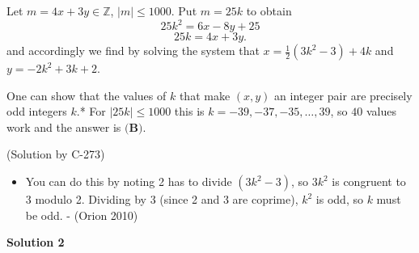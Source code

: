 \begin{enumerate}
 Let $m = 4x+3y \in \mathbb Z$, $\left\lvert m \right\rvert \le 1000$.  Put $m = 25k$ to obtain
 \[25k^2 = 6x-8y+25\]
 \[25k = 4x+3y.\]and accordingly we find by solving the system that $x = \frac{1}{2} (3k^2-3) + 4k$ and $y = -2k^2+3k+2$.

 One can show that the values of $k$ that make $(x,y)$ an integer pair are precisely odd integers $k$.*  For $\left\lvert 25k \right\rvert \le 1000$ this is $k= -39,-37,-35,\dots,39$, so $40$ values work and the answer is $\boxed{\textbf{(B)}}$.

 (Solution by C-273)

 
            \begin{itemize}
        \item You can do this by noting 2 has to divide $(3k^2-3)$, so $3k^2$ is congruent to 3 modulo 2. Dividing by 3 (since 2 and 3 are coprime), $k^2$ is odd, so $k$ must be odd. - (Orion 2010)
            \end{itemize}
            



\textbf{Solution 2}


\end{enumerate}
